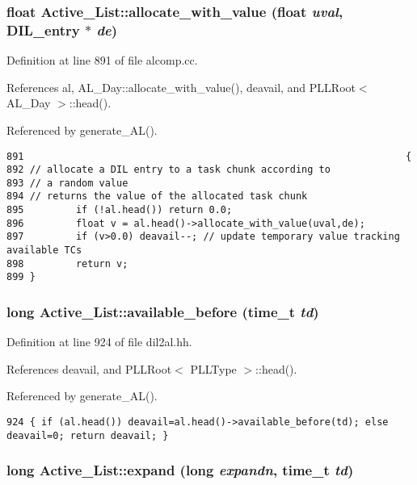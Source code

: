 \subsubsection{\setlength{\rightskip}{0pt plus 5cm}float Active\_\-List::allocate\_\-with\_\-value (float {\em uval}, {\bf DIL\_\-entry} $\ast$ {\em de})}\label{classActive__List_a10}




Definition at line 891 of file alcomp.cc.

References al, AL\_\-Day::allocate\_\-with\_\-value(), deavail, and PLLRoot$<$ AL\_\-Day $>$::head().

Referenced by generate\_\-AL().



\footnotesize\begin{verbatim}891                                                                  {
892 // allocate a DIL entry to a task chunk according to
893 // a random value
894 // returns the value of the allocated task chunk
895         if (!al.head()) return 0.0;
896         float v = al.head()->allocate_with_value(uval,de);
897         if (v>0.0) deavail--; // update temporary value tracking available TCs
898         return v;
899 }
\end{verbatim}\normalsize 
{}
\subsubsection{\setlength{\rightskip}{0pt plus 5cm}long Active\_\-List::available\_\-before (time\_\-t {\em td})\hspace{0.3cm}{\tt  [inline]}}\label{classActive__List_a5}




Definition at line 924 of file dil2al.hh.

References deavail, and PLLRoot$<$ PLLType $>$::head().

Referenced by generate\_\-AL().



\footnotesize\begin{verbatim}924 { if (al.head()) deavail=al.head()->available_before(td); else deavail=0; return deavail; }
\end{verbatim}\normalsize 
{}
\subsubsection{\setlength{\rightskip}{0pt plus 5cm}long Active\_\-List::expand (long {\em expandn}, time\_\-t {\em td})}\label{classActive__List_a6}




